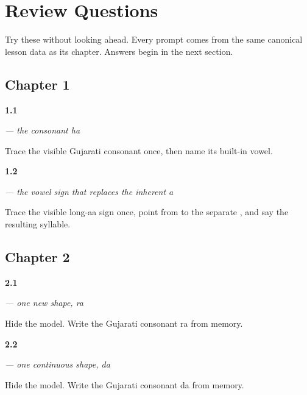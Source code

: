 
\chapter*{Review Questions}

Try these without looking ahead. Every prompt comes from the same canonical lesson data as its chapter. Answers begin in the next section.

\section*{Chapter 1}

\noindent\begin{minipage}[t]{\linewidth}
\raggedright
\hypertarget{review-GU-W01-ha-observe-check}{\textbf{1.1}} \emph{ — the consonant ha}\par
\small Trace the visible Gujarati consonant once, then name its built-in vowel.
\end{minipage}\par\medskip

\noindent\begin{minipage}[t]{\linewidth}
\raggedright
\hypertarget{review-GU-W01-aa-matra-observe-check}{\textbf{1.2}} \emph{ — the vowel sign that replaces the inherent a}\par
\small Trace the visible long-aa sign once, point from  to the separate , and say the resulting syllable.
\end{minipage}\par\medskip

\section*{Chapter 2}

\noindent\begin{minipage}[t]{\linewidth}
\raggedright
\hypertarget{review-GU-W02-ra-recall}{\textbf{2.1}} \emph{ — one new shape, ra}\par
\small Hide the model. Write the Gujarati consonant ra from memory.
\end{minipage}\par\medskip

\noindent\begin{minipage}[t]{\linewidth}
\raggedright
\hypertarget{review-GU-W02-da-recall}{\textbf{2.2}} \emph{ — one continuous shape, da}\par
\small Hide the model. Write the Gujarati consonant da from memory.
\end{minipage}\par\medskip

